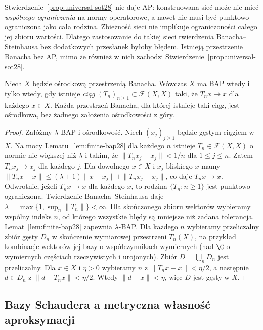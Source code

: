 \begin{uwaga}
\label{rem:net-vs-ap28}
Stwierdzenie~\ref{prop:universal-sot28} nie daje AP:
konstruowana sieć może nie mieć \emph{wspólnego ograniczenia}
na normy operatorowe, a nawet nie musi być punktowo
ograniczona jako cała rodzina. Zbieżność sieci nie implikuje
ograniczoności całego jej zbioru wartości. Dlatego
zastosowanie do takiej sieci twierdzenia Banacha--Steinhausa
bez dodatkowych przesłanek byłoby błędem.
Istnieją przestrzenie Banacha bez AP, mimo że również
w nich zachodzi Stwierdzenie~\ref{prop:universal-sot28}.
\end{uwaga}

\begin{twierdzenie}
\label{thm:sequence-bap28}
Niech $X$ będzie ośrodkową przestrzenią Banacha.
Wówczas $X$ ma BAP wtedy i tylko wtedy, gdy istnieje
\emph{ciąg} $(T_n)_{n\ge1}\subset\mathcal F(X,X)$
taki, że $T_nx\to x$ dla każdego $x\in X$.
Każda przestrzeń Banacha, dla której istnieje taki ciąg,
jest ośrodkowa, bez żadnego założenia ośrodkowości z góry.
\end{twierdzenie}
\begin{proof}
Załóżmy $\lambda$-BAP i ośrodkowość.
Niech $(x_j)_{j\ge1}$ będzie gęstym ciągiem w $X$.
Na mocy Lematu~\ref{lem:finite-bap28} dla każdego $n$
istnieje $T_n\in\mathcal F(X,X)$ o normie nie większej
niż $\lambda$ i takim, że $\|T_nx_j-x_j\|<1/n$
dla $1\le j\le n$. Zatem $T_nx_j\to x_j$ dla każdego $j$.
Dla dowolnego $x\in X$ i $x_j$ bliskiego $x$ mamy
$\|T_nx-x\|\le(\lambda+1)\|x-x_j\|+\|T_nx_j-x_j\|$,
co daje $T_nx\to x$.
Odwrotnie, jeżeli $T_nx\to x$ dla każdego $x$, to rodzina
$\{T_n:n\ge1\}$ jest punktowo ograniczona. Twierdzenie
Banacha--Steinhausa daje $\lambda=\max\{1,\sup_n\|T_n\|\}<\infty$.
Dla skończonego zbioru wektorów wybieramy wspólny indeks $n$,
od którego wszystkie błędy są mniejsze niż zadana tolerancja.
Lemat~\ref{lem:finite-bap28} zapewnia $\lambda$-BAP.
Dla każdego $n$ wybieramy przeliczalny zbiór gęsty $D_n$
w skończenie wymiarowej przestrzeni $T_n(X)$, na przykład
kombinacje wektorów jej bazy o współczynnikach wymiernych
(nad $\C$ o wymiernych częściach rzeczywistych i urojonych).
Zbiór $D=\bigcup_nD_n$ jest przeliczalny. Dla $x\in X$
i $\eta>0$ wybieramy $n$ z $\|T_nx-x\|<\eta/2$,
a następnie $d\in D_n$ z $\|d-T_nx\|<\eta/2$.
Wtedy $\|d-x\|<\eta$, więc $D$ jest gęsty w $X$.
\end{proof}

\subsection{Bazy Schaudera a metryczna własność aproksymacji}

